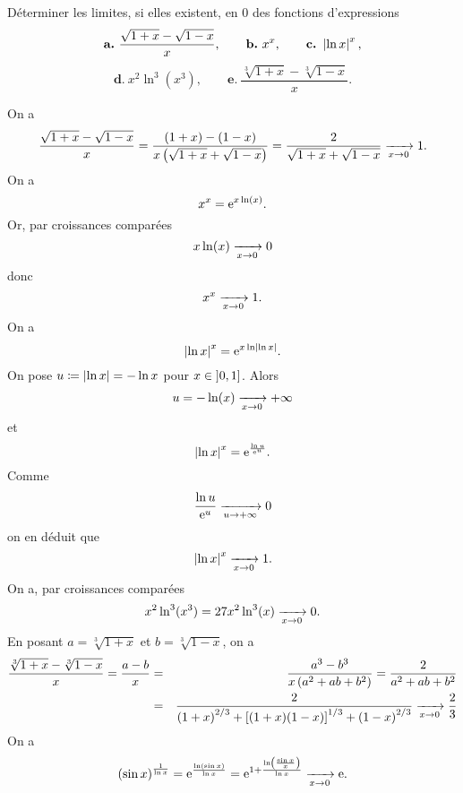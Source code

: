\documentclass{magnolia}
\begin{document}
Déterminer les limites, si elles existent, en $0$ des fonctions
d'expressions
\[\textbf{a.}\ \frac{\sqrt{1+x}-\sqrt{1-x}}{x}, \qquad
\textbf{b.}\ x^x, \qquad \textbf{c.}\ \abs{\ln x}^x,\]
\[\textbf{d.}\ x^2 \ln^3(x^3), \qquad \textbf{e.}\ \frac{\sqrt[3]{1+x}-\sqrt[3]{1-x}}{x}.\]
\begin{sol}
\begin{questions}
\question On a
\[\frac{\sqrt{1+x}-\sqrt{1-x}}{x}=\frac{(1+x)-(1-x)}{x\left(\sqrt{1+x}+\sqrt{1-x}\right)}=\frac{2}{\sqrt{1+x}+\sqrt{1-x}}\xrightarrow[x\rightarrow 0]{}1.\]
\question On a
\[x^x={\rm e}^{x \ln(x)}.\]
Or, par croissances comparées
\[x\ln(x)\xrightarrow[x\rightarrow 0]{}0\]
donc
\[x^x\xrightarrow[x\rightarrow 0]{}1.\]
\question On a
\[\left|\ln x\right|^x={\rm e}^{x\ln\left|\ln x\right|}.\]
On pose $u\coloneqq \left|\ln x\right|=-\ln x$ pour $x\in\left]0,1\right]$. Alors
\[u=-\ln(x)\xrightarrow[x\rightarrow 0]{}+\infty\]
et
\[\left|\ln x\right|^x={\rm e}^{\frac{\ln u}{{\rm e}^ u}}.\]
Comme
\[\frac{\ln u}{{\rm e}^ u}\xrightarrow[u\rightarrow +\infty]{}0\]
on en déduit que
\[\left|\ln x\right|^x\xrightarrow[x\rightarrow 0]{}1.\]
\question On a, par croissances comparées
  \[x^2 \ln^3(x^3)=27 x^2\ln^3(x)\xrightarrow[x\rightarrow 0]{}0.\]
\question En posant $a=\sqrt[3]{1+x}$ et $b=\sqrt[3]{1-x}$, on a
\begin{eqnarray*}
 \frac{\sqrt[3]{1+x}-\sqrt[3]{1-x}}{x}=\frac{a-b}{x}
 &=&\frac{a^3-b^3}{x\left(a^2+ab+b^2\right)}=\frac{2}{a^2+ab+b^2}\\
 &=&\frac{2}{\left(1+x\right)^{2/3}+\left[(1+x)(1-x)\right]^{1/3}+\left(1-x\right)^{2/3}}\xrightarrow[x\rightarrow 0]{}\frac{2}{3}
 \end{eqnarray*}
\question On a
\[\left(\sin x\right)^{\frac{1}{\ln x}}={\rm e}^{\frac{\ln(\sin x)}{\ln x}}={\rm e}^{1+\frac{\ln\left(\frac{\sin x}{x}\right)}{\ln x}}\xrightarrow[x\rightarrow 0]{}{\rm e}.\]

\end{questions}
\end{sol}






\end{document}

